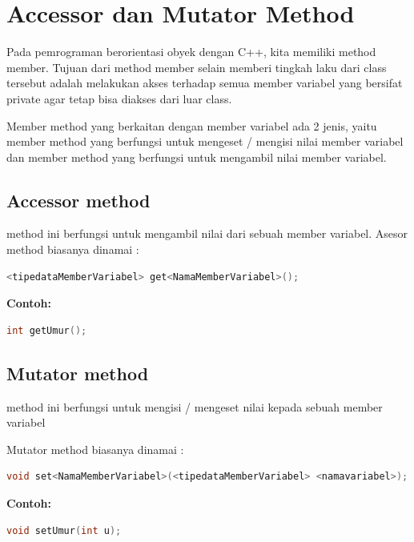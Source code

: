 \section{Accessor dan Mutator
Method}\label{accessor-dan-mutator-method}

Pada pemrograman berorientasi obyek dengan C++, kita memiliki method
member. Tujuan dari method member selain memberi tingkah laku dari class
tersebut adalah melakukan akses terhadap semua member variabel yang
bersifat private agar tetap bisa diakses dari luar class.

Member method yang berkaitan dengan member variabel ada 2 jenis, yaitu
member method yang berfungsi untuk mengeset / mengisi nilai member
variabel dan member method yang berfungsi untuk mengambil nilai member
variabel.

\subsection{Accessor method}\label{accessor-method}

method ini berfungsi untuk mengambil nilai dari sebuah member variabel.
Asesor method biasanya dinamai :

\begin{lstlisting}[language=c++]
<tipedataMemberVariabel> get<NamaMemberVariabel>();
\end{lstlisting}

\textbf{Contoh:}

\begin{lstlisting}[language=c++]
int getUmur();
\end{lstlisting}

\subsection{Mutator method}\label{mutator-method}

method ini berfungsi untuk mengisi / mengeset nilai kepada sebuah member
variabel

Mutator method biasanya dinamai :

\begin{lstlisting}[language=c++]
void set<NamaMemberVariabel>(<tipedataMemberVariabel> <namavariabel>);
\end{lstlisting}

\textbf{Contoh:}

\begin{lstlisting}[language=c++]
void setUmur(int u);
\end{lstlisting}

